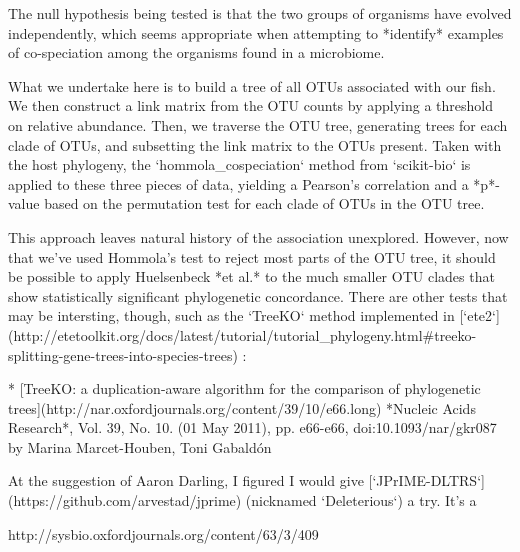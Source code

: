 The null hypothesis being tested is that the two groups of organisms have
evolved independently, which seems appropriate when attempting to *identify*
examples of co-speciation among the organisms found in a microbiome. 

What we undertake here is to build a tree of all OTUs associated with our
fish. We then construct a link matrix from the OTU counts by applying a
threshold on relative abundance. Then, we traverse the OTU tree, generating
trees for each clade of OTUs, and subsetting the link matrix to the OTUs
present. Taken with the host phylogeny, the `hommola_cospeciation` method 
from `scikit-bio` is applied to these three pieces of data, yielding a 
Pearson's correlation and a *p*-value based on the permutation test for 
each clade of OTUs in the OTU tree.

This approach leaves natural history of the association unexplored. However,
now that we've used Hommola's test to reject most parts of the OTU tree, it
should be possible to apply Huelsenbeck *et al.* to the much smaller OTU 
clades that show statistically significant phylogenetic concordance. There
are other tests that may be intersting, though, such as the `TreeKO` method
implemented in [`ete2`](http://etetoolkit.org/docs/latest/tutorial/tutorial_phylogeny.html#treeko-splitting-gene-trees-into-species-trees) :

* [TreeKO: a duplication-aware algorithm for the comparison of phylogenetic trees](http://nar.oxfordjournals.org/content/39/10/e66.long) *Nucleic Acids Research*, Vol. 39, No. 10. (01 May 2011), pp. e66-e66, doi:10.1093/nar/gkr087 by Marina Marcet-Houben, Toni Gabaldón

At the suggestion of Aaron Darling, I figured I would give 
[`JPrIME-DLTRS`](https://github.com/arvestad/jprime) (nicknamed `Deleterious`)
a try. It's a 

http://sysbio.oxfordjournals.org/content/63/3/409